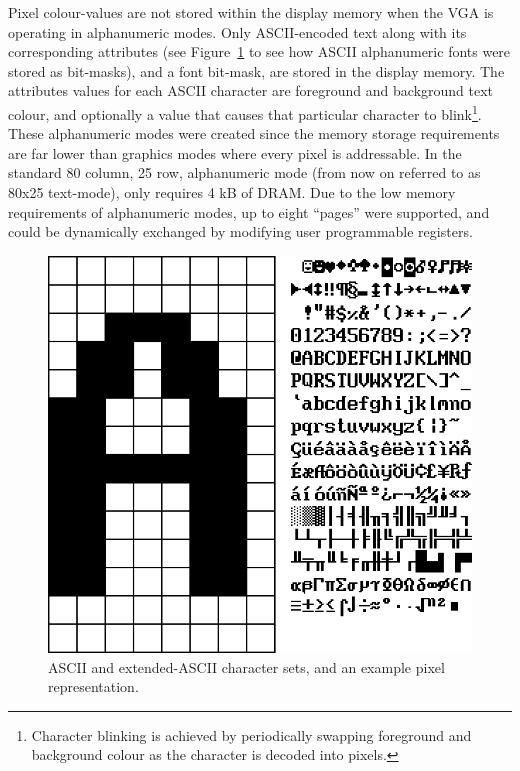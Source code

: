 Pixel colour-values are not stored within the display memory when the VGA is
operating in alphanumeric modes. Only ASCII-encoded text along with its
corresponding attributes (see Figure~\ref{INTRO_ASCII} to see how ASCII
alphanumeric fonts were stored as bit-masks), and a font bit-mask, are stored in
the display memory. The attributes values for each ASCII character are foreground
and background text colour, and optionally a value that causes that particular
character to blink\footnote{Character blinking is achieved by periodically
swapping foreground and background colour as the character is decoded into
pixels.}. These alphanumeric modes were created since the memory storage
requirements are far lower than graphics modes where every pixel is addressable.
In the standard 80 column, 25 row, alphanumeric mode (from now on referred to as
80x25 text-mode), only requires 4 kB of DRAM. Due to the low memory requirements
of alphanumeric modes, up to eight ``pages'' were supported, and could be
dynamically exchanged by modifying user programmable registers.

\begin{figure}[h!]
\begin{center}
\includegraphics[width=\linewidth]{images/ascii.png}
\caption[ASCII and extended-ASCII character set]{ASCII and extended-ASCII
character sets, and an example pixel representation.}
\label{INTRO_ASCII}
\end{center}
\end{figure}


